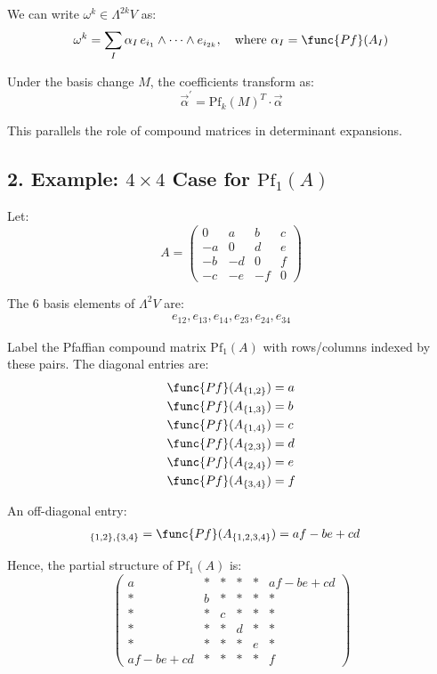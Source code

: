 \documentclass[aps,prd,onecolumn,notitlepage,nofootinbib]{revtex4-2}
\begin{document}
We can write $\omega^k \in \Lambda^{2k} V$ as: 
\begin{equation}
\omega^k = \sum_I \alpha_I \, e_{i_1} \wedge \cdots \wedge e_{i_{2k}}, \quad 
\text{where } \alpha_I = \func{Pf}(A_I)
\end{equation}

Under the basis change $M$, the coefficients transform as: 
\begin{equation}
\vec{\alpha}^{\prime }= \mathrm{Pf}_k(M)^T \cdot \vec{\alpha}
\end{equation}

This parallels the role of compound matrices in determinant expansions.

\subsection*{2. Example: $4 \times 4$ Case for $\mathrm{Pf}_1(A)$}

Let: 
\begin{equation}
A = 
\begin{pmatrix}
0 & a & b & c \\ 
-a & 0 & d & e \\ 
-b & -d & 0 & f \\ 
-c & -e & -f & 0%
\end{pmatrix}%
\end{equation}

The 6 basis elements of $\Lambda^2 V$ are: 
\begin{align*}
e_{12}, e_{13}, e_{14}, e_{23}, e_{24}, e_{34}
\end{align*}

Label the Pfaffian compound matrix $\mathrm{Pf}_1(A)$ with rows/columns
indexed by these pairs. The diagonal entries are: 
\begin{align*}
\func{Pf}(A_{\{1,2\}}) &= a \\
\func{Pf}(A_{\{1,3\}}) &= b \\
\func{Pf}(A_{\{1,4\}}) &= c \\
\func{Pf}(A_{\{2,3\}}) &= d \\
\func{Pf}(A_{\{2,4\}}) &= e \\
\func{Pf}(A_{\{3,4\}}) &= f
\end{align*}

An off-diagonal entry: 
\begin{align*}
[\mathrm{Pf}_1(A)]_{\{1,2\},\{3,4\}} &= \func{Pf}(A_{\{1,2,3,4\}}) = af - be
+ cd
\end{align*}

Hence, the partial structure of $\mathrm{Pf}_1(A)$ is: 
\begin{equation}
\begin{pmatrix}
a & * & * & * & * & af - be + cd \\* 
& b & * & * & * & * \\* 
& * & c & * & * & * \\* 
& * & * & d & * & * \\* 
& * & * & * & e & * \\ 
af - be + cd & * & * & * & * & f%
\end{pmatrix}%
\end{equation}
\end{document}
